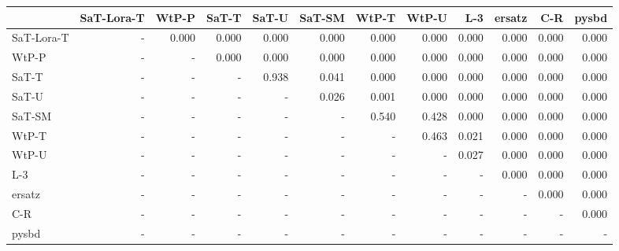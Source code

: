 \begin{tabular}{lrrrrrrrrrrr}
\toprule
 & SaT-Lora-T & WtP-P & SaT-T & SaT-U & SaT-SM & WtP-T & WtP-U & L-3 & ersatz & C-R & pysbd \\
\midrule
SaT-Lora-T & - & 0.000 & 0.000 & 0.000 & 0.000 & 0.000 & 0.000 & 0.000 & 0.000 & 0.000 & 0.000 \\
WtP-P & - & - & 0.000 & 0.000 & 0.000 & 0.000 & 0.000 & 0.000 & 0.000 & 0.000 & 0.000 \\
SaT-T & - & - & - & 0.938 & 0.041 & 0.000 & 0.000 & 0.000 & 0.000 & 0.000 & 0.000 \\
SaT-U & - & - & - & - & 0.026 & 0.001 & 0.000 & 0.000 & 0.000 & 0.000 & 0.000 \\
SaT-SM & - & - & - & - & - & 0.540 & 0.428 & 0.000 & 0.000 & 0.000 & 0.000 \\
WtP-T & - & - & - & - & - & - & 0.463 & 0.021 & 0.000 & 0.000 & 0.000 \\
WtP-U & - & - & - & - & - & - & - & 0.027 & 0.000 & 0.000 & 0.000 \\
L-3 & - & - & - & - & - & - & - & - & 0.000 & 0.000 & 0.000 \\
ersatz & - & - & - & - & - & - & - & - & - & 0.000 & 0.000 \\
C-R & - & - & - & - & - & - & - & - & - & - & 0.000 \\
pysbd & - & - & - & - & - & - & - & - & - & - & - \\
\bottomrule
\end{tabular}

